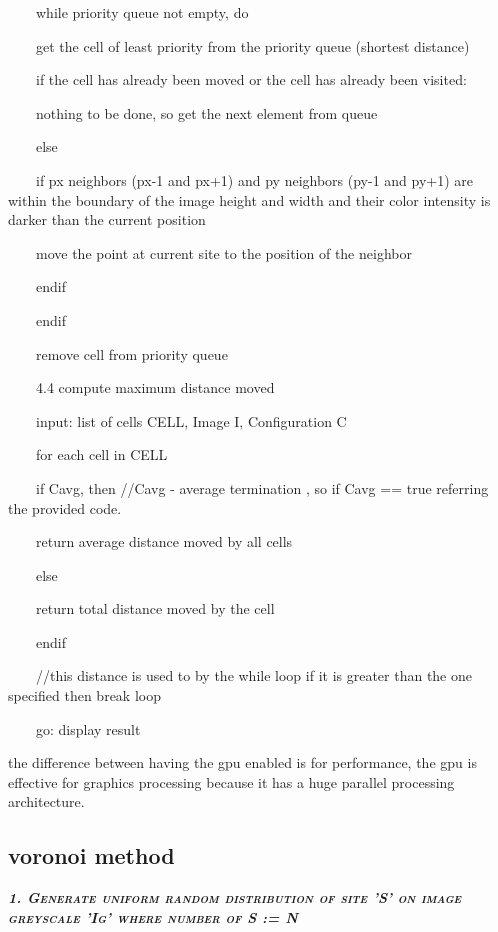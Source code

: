 \documentclass[11pt,a4paper]{article}
\begin{document}
\ \ \ \ while priority queue not empty, do

\ \ \ \ get the cell of least priority from the priority queue (shortest
distance)



\ \ \ \ if the cell has already been moved or the cell has already been
visited:

\ \ \ \ nothing to be done, so get the next element from queue

\ \ \ \ else

\ \ \ \ if px neighbors (px-1 and px+1) and py neighbors (py-1 and py+1)
are within the boundary of the image height and width and their color
intensity is darker than the current position

\ \ \ \ move the point at current site to the position of the neighbor

\ \ \ \ endif

\ \ \ \ endif

\ \ \ \ remove cell from priority queue



\ \ \ \ 4.4 compute maximum distance moved

\ \ \ \ input: list of cells CELL, Image I, Configuration C

\ \ \ \ for each cell in CELL

\ \ \ \ if Cavg, then //Cavg - average termination , so if Cavg == true
referring the provided code.

\ \ \ \ return average distance moved by all cells

\ \ \ \ else

\ \ \ \ return total distance moved by the cell

\ \ \ \ endif

\ \ \ \ //this distance is used to by the while loop if it is greater
than the one specified then break loop

\ \ \ \ go: display result



the difference between having the gpu enabled is for performance, the
gpu is effective for graphics processing because it has a huge parallel
processing architecture.



\subsection{voronoi method}


\textbf{\textit{\textsc{\textsc{1. Generate uniform random
distribution of site 'S' on image greyscale 'Ig' where number of S := N
}}}}
\end{document}
